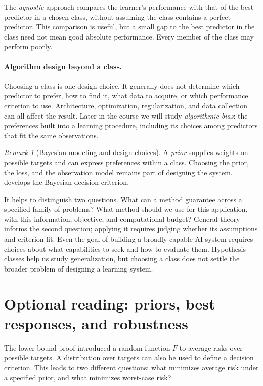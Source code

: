 \documentclass[11pt,twoside]{article}
\theoremstyle{definition}
\theoremstyle{remark}
\newtheorem{remark}[theorem]{Remark}
\begin{document}
The \emph{agnostic} approach compares the learner's performance with that
of the best predictor in a chosen class, without assuming the class contains
a perfect predictor. This comparison is useful, but a small gap to the best
predictor in the class need not mean good absolute performance. Every member
of the class may perform poorly.

\paragraph{Algorithm design beyond a class.}
Choosing a class is one design choice. It generally does not determine which
predictor to prefer, how to find it, what data to acquire, or which performance
criterion to use. Architecture, optimization, regularization, and data
collection can all affect the result. Later in the course we will study
\emph{algorithmic bias}: the preferences built into a learning procedure,
including its choices among predictors that fit the same observations.

\begin{remark}[Bayesian modeling and design choices]
\label{rem:bayesian-design-choices}
A \emph{prior} supplies weights on possible targets and can express preferences
within a class. Choosing the prior, the loss, and the observation model
remains part of designing the system.  develops
the Bayesian decision criterion.
\end{remark}

It helps to distinguish two questions. What can a method guarantee across a
specified family of problems? What method should we use for this application,
with this information, objective, and computational budget? General theory
informs the second question; applying it requires judging whether its
assumptions and criterion fit. Even the goal of building a broadly capable AI
system requires choices about what capabilities to seek and how to evaluate
them. Hypothesis classes help us study generalization, but choosing a class
does not settle the broader problem of designing a learning system.

\section{Optional reading: priors, best responses, and robustness}
\label{sec:optional-reading}
\label{app:decision-theory}

The lower-bound proof introduced a random function $F$ to average risks over
possible targets. A distribution over targets can also be used to define a
decision criterion. This leads to two different questions: what minimizes
average risk under a specified prior, and what minimizes worst-case risk?
\end{document}
